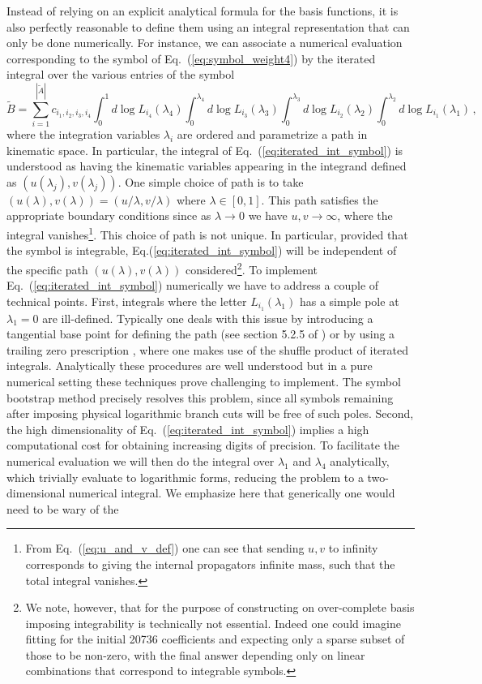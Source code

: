 \documentclass[a4paper,11pt]{article}
\begin{document}
Instead of relying on an explicit analytical formula for the basis functions, it is also perfectly reasonable to define them using an integral representation that can only be done numerically. For instance, we can associate a numerical evaluation corresponding to the symbol of Eq.~(\ref{eq:symbol_weight4}) by the iterated integral over the various entries of the symbol
\begin{equation} \label{eq:iterated_int_symbol}
    \tilde{B}= \sum_{i=1}^{|\tilde{A}|}  c_{i_1,i_2,i_3,i_4} \int_0^1 d \log L_{i_4}(\lambda_4)  \int_0^{\lambda_4} d \log L_{i_3}(\lambda_3) \int_0^{\lambda_3} d \log L_{i_2}(\lambda_2) \int_0^{\lambda_2} d \log L_{i_1}(\lambda_1) \,,
\end{equation}
where the integration variables $\lambda_i$ are ordered and parametrize a path in kinematic space. In particular, the integral of Eq.~(\ref{eq:iterated_int_symbol}) is understood as having the kinematic variables appearing in the integrand defined as $(u(\lambda_j), v(\lambda_j))$. One simple choice of path is to take $(u(\lambda), v(\lambda))=(u/\lambda, v/\lambda)$ where $\lambda \in [0,1]$. This path satisfies the appropriate boundary conditions since as $\lambda \rightarrow 0$ we have $u, v \rightarrow \infty$, where the integral vanishes\footnote{From Eq.~(\ref{eq:u_and_v_def}) one can see that sending $u, v$ to infinity corresponds to giving the internal propagators infinite mass, such that the total integral vanishes.}. This choice of path is not unique. In particular, provided that the symbol is integrable, Eq.(\ref{eq:iterated_int_symbol}) will be independent of the specific path $(u(\lambda), v(\lambda))$ considered\footnote{We note, however, that for the purpose of constructing on over-complete basis imposing integrability is technically not essential. Indeed one could imagine fitting for the initial 20736 coefficients and expecting only a sparse subset of those to be non-zero, with the final answer depending only on linear combinations that correspond to integrable symbols.}. To implement Eq.~(\ref{eq:iterated_int_symbol}) numerically we have to address a couple of technical points. First, integrals where the letter $L_{i_1}(\lambda_1)$ has a simple pole at $\lambda_1=0$ are ill-defined. Typically one deals with this issue by introducing a tangential base point for defining the path (see section 5.2.5 of \cite{Brown:2013qva}) or by using a trailing zero prescription \cite{Walden:2020odh}, where one makes use of the shuffle product of iterated integrals. Analytically these procedures are well understood but in a pure numerical setting these techniques prove challenging to implement. The symbol bootstrap method precisely resolves this problem, since all symbols remaining after imposing physical logarithmic branch cuts will be free of such poles. Second, the high dimensionality of Eq.~(\ref{eq:iterated_int_symbol}) implies a high computational cost for obtaining increasing digits of precision. To facilitate the numerical evaluation we will then do the integral over $\lambda_1$ and $\lambda_4$ analytically, which trivially evaluate to logarithmic forms, reducing the problem to a two-dimensional numerical integral. We emphasize here that generically one would need to be wary of the 
\end{document}
